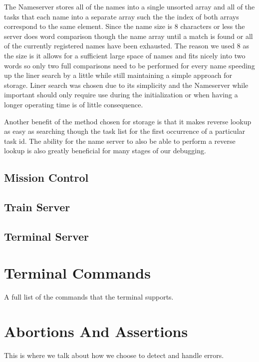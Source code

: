 \documentclass[pdftex,10pt,a4paper]{article}
\begin{document}
The Nameserver stores all of the names into a single unsorted array
and all of the tasks that each name into a separate array such the the
index of both arrays correspond to the same element. Since the name
size is 8 characters or less the server does word comparison though
the name array until a match is found or all of the currently
registered names have been exhausted. The reason we used 8 as the size
is it allows for a sufficient large space of names and fits nicely
into two words so only two full comparisons need to be performed for
every name speeding up the liner search by a little while still
maintaining a simple approach for storage. Liner search was chosen due
to its simplicity and the Nameserver while important should only
require use during the initialization or when having a longer
operating time is of little consequence.

Another benefit of the method chosen for storage is that it makes reverse
lookup as easy as searching though the task list for the first occurrence 
of a particular task id. The ability for the name server to also be able to
perform a reverse lookup is also greatly beneficial for many stages of our
debugging.

\subsection*{Mission Control}

\subsection*{Train Server}

\subsection*{Terminal Server}


\section*{Terminal Commands}

A full list of the commands that the terminal supports.

\section*{Abortions And Assertions}

This is where we talk about how we choose to detect and handle errors.
\end{document}
